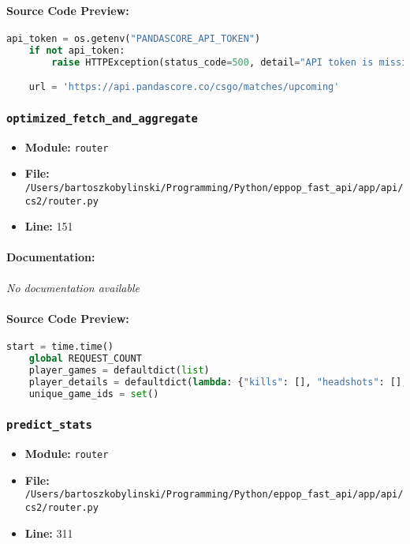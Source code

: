 \documentclass[11pt,a4paper]{article}
\begin{document}
\paragraph{Source Code Preview:}
\begin{lstlisting}[language=Python]
    api_token = os.getenv("PANDASCORE_API_TOKEN")
    if not api_token:
        raise HTTPException(status_code=500, detail="API token is missing")

    url = 'https://api.pandascore.co/csgo/matches/upcoming'
\end{lstlisting}

\vspace{1em}
\subsubsection{\texttt{optimized\_fetch\_and\_aggregate}}

\begin{itemize}
    \item \textbf{Module:} \texttt{router}
    \item \textbf{File:} \texttt{/Users/bartoszkobylinski/Programming/Python/eppop\_fast\_api/app/api/cs2/router.py}
    \item \textbf{Line:} 151
\end{itemize}

\paragraph{Documentation:} \textit{No documentation available}

\paragraph{Source Code Preview:}
\begin{lstlisting}[language=Python]
    start = time.time()
    global REQUEST_COUNT
    player_games = defaultdict(list)
    player_details = defaultdict(lambda: {"kills": [], "headshots": [], "rounds": []})
    unique_game_ids = set()
\end{lstlisting}

\vspace{1em}
\subsubsection{\texttt{predict\_stats}}

\begin{itemize}
    \item \textbf{Module:} \texttt{router}
    \item \textbf{File:} \texttt{/Users/bartoszkobylinski/Programming/Python/eppop\_fast\_api/app/api/cs2/router.py}
    \item \textbf{Line:} 311
\end{itemize}
\end{document}
